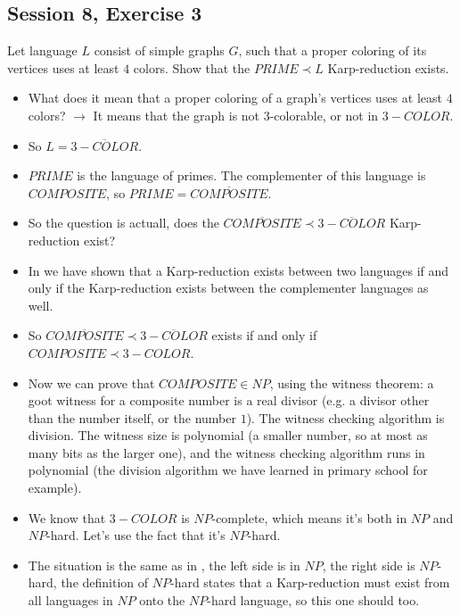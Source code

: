 \subsection {Session 8, Exercise 3}
\label{8f3}


Let language $L$ consist of simple graphs $G$, such that a proper coloring of its vertices uses at least $4$ colors. Show that the $PRIME \prec L$ Karp-reduction exists.


\begin{itemize}
    \item What does it mean that a proper coloring of a graph's vertices uses at least $4$ colors? $\rightarrow$ It means that the graph is not 3-colorable, or not in $3-COLOR$.
    \item So $L = \overline{3-COLOR}$.
    \item $PRIME$ is the language of primes. The complementer of this language is $COMPOSITE$, so $PRIME = \overline{COMPOSITE}$.
    \item So the question is actuall, does the $\overline{COMPOSITE} \prec \overline{3-COLOR}$ Karp-reduction exist?
    \item In  we have shown that a Karp-reduction exists between two languages if and only if the Karp-reduction exists between the complementer languages as well.
    \item So $\overline{COMPOSITE} \prec \overline{3-COLOR}$ exists if and only if $COMPOSITE \prec 3-COLOR$.
    \item Now we can prove that $COMPOSITE \in{} NP$, using the witness theorem: a goot witness for a composite number is a real divisor (e.g. a divisor other than the number itself, or the number $1$). The witness checking algorithm is division. The witness size is polynomial (a smaller number, so at most as many bits as the larger one), and the witness checking algorithm runs in polynomial (the division algorithm we have learned in primary school for example).
    \item We know that $3-COLOR$ is $NP$-complete, which means it's both in $NP$ and $NP$-hard. Let's use the fact that it's $NP$-hard.
    \item The situation is the same as in , the left side is in $NP$, the right side is $NP$-hard, the definition of $NP$-hard states that a Karp-reduction must exist from all languages in $NP$ onto the $NP$-hard language, so this one should too.
\end{itemize}

